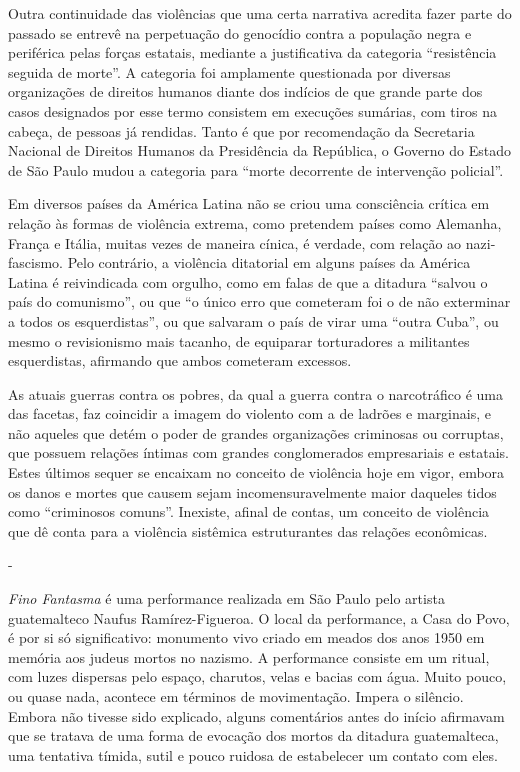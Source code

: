 Outra continuidade das violências que uma certa narrativa acredita fazer
parte do passado se entrevê na perpetuação do genocídio contra a
população negra e periférica pelas forças estatais, mediante a
justificativa da categoria ``resistência seguida de morte''. A categoria
foi amplamente questionada por diversas organizações de direitos humanos
diante dos indícios de que grande parte dos casos designados por esse
termo consistem em execuções sumárias, com tiros na cabeça, de pessoas
já rendidas. Tanto é que por recomendação da Secretaria Nacional de
Direitos Humanos da Presidência da República, o Governo do Estado de São
Paulo mudou a categoria para ``morte decorrente de intervenção
policial''.

Em diversos países da América Latina não se criou uma consciência
crítica em relação às formas de violência extrema, como pretendem países
como Alemanha, França e Itália, muitas vezes de maneira cínica, é
verdade, com relação ao nazi-fascismo. Pelo contrário, a violência
ditatorial em alguns países da América Latina é reivindicada com
orgulho, como em falas de que a ditadura ``salvou o país do comunismo'',
ou que ``o único erro que cometeram foi o de não exterminar a todos os
esquerdistas'', ou que salvaram o país de virar uma ``outra Cuba'', ou
mesmo o revisionismo mais tacanho, de equiparar torturadores a
militantes esquerdistas, afirmando que ambos cometeram excessos.

As atuais guerras contra os pobres, da qual a guerra contra o
narcotráfico é uma das facetas, faz coincidir a imagem do violento com a
de ladrões e marginais, e não aqueles que detém o poder de grandes
organizações criminosas ou corruptas, que possuem relações íntimas com
grandes conglomerados empresariais e estatais. Estes últimos sequer se
encaixam no conceito de violência hoje em vigor, embora os danos e
mortes que causem sejam incomensuravelmente maior daqueles tidos como
``criminosos comuns''. Inexiste, afinal de contas, um conceito de
violência que dê conta para a violência sistêmica estruturantes das
relações econômicas.

-

\emph{Fino Fantasma} é uma performance realizada em São Paulo pelo
artista guatemalteco Naufus Ramírez-Figueroa. O local da performance, a
Casa do Povo, é por si só significativo: monumento vivo criado em meados
dos anos 1950 em memória aos judeus mortos no nazismo. A performance
consiste em um ritual, com luzes dispersas pelo espaço, charutos, velas
e bacias com água. Muito pouco, ou quase nada, acontece em términos de
movimentação. Impera o silêncio. Embora não tivesse sido explicado,
alguns comentários antes do início afirmavam que se tratava de uma forma
de evocação dos mortos da ditadura guatemalteca, uma tentativa tímida,
sutil e pouco ruidosa de estabelecer um contato com eles.

